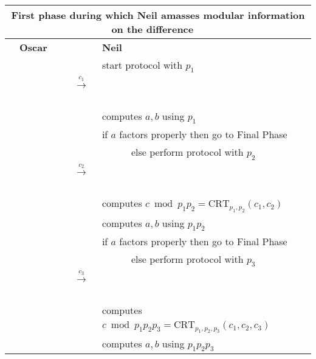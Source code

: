 \documentclass[11pt]{llncs}
\begin{document}
\begin{center}
\begin{tabular}{|lcl|}\hline
\multicolumn{3}{|c|}{{\sf First phase during which Neil amasses modular information on the difference~~}} \\\hline
~~{\bf Oscar}                      &                                                      &   {\bf Neil}~\\
                                   &                                                      &start protocol with $p_1$~\\
                                   &~~{{\LARGE $\stackrel{c_1}{\longrightarrow}$}}~~      &   \\
                                   &                                                      &computes $a,b$ using $p_1$~\\
                                   &                                                      &if $a$ factors properly then go to {\sf Final Phase}\\
                                   &                                                      &~~~~~~else perform protocol with $p_2$~~\\
                                   &~~{{\LARGE $\stackrel{c_2}{\longrightarrow}$}}~~      &   \\
                                   &                                                      &computes $c \bmod p_1 p_2=\mbox{CRT}_{p_1,p_2}(c_1,c_2)$~~\\
                                   &                                                      &computes $a,b$ using $p_1 p_2$~\\
                                   &                                                      &if $a$ factors properly then go to {\sf Final Phase}\\
                                   &                                                      &~~~~~~else perform protocol with $p_3$~~\\
                                   &~~{{\LARGE $\stackrel{c_3}{\longrightarrow}$}}~~      &   \\
                                   &                                                      &computes $c \bmod p_1 p_2 p_3=\mbox{CRT}_{p_1,p_2,p_3}(c_1,c_2,c_3)$~~\\
                                   &                                                      &computes $a,b$ using $p_1 p_2 p_3$~\\

\end{tabular}
\end{center}
\end{document}
